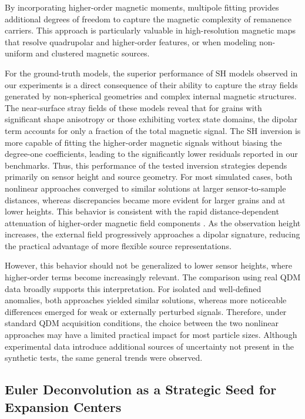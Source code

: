 By incorporating higher-order magnetic moments, multipole fitting provides additional degrees of freedom to capture the magnetic complexity of remanence carriers. This approach is particularly valuable in high-resolution magnetic maps that resolve quadrupolar and higher-order features, or when modeling non-uniform and clustered magnetic sources.

For the ground-truth models, the superior performance of SH models observed in our experiments is a direct consequence of their ability to capture the stray fields generated by non-spherical geometries and complex internal magnetic structures. The near-surface stray fields of these models reveal that for grains with significant shape anisotropy or those exhibiting vortex state domains, the dipolar term accounts for only a fraction of the total magnetic signal. The SH inversion is more capable of fitting the higher-order magnetic signals without biasing the degree-one coefficients, leading to the significantly lower residuals reported in our benchmarks. Thus, this performance of the tested inversion strategies depends primarily on sensor height and source geometry. For most simulated cases, both nonlinear approaches converged to similar solutions at larger sensor-to-sample distances, whereas discrepancies became more evident for larger grains and at lower heights. This behavior is consistent with the rapid distance-dependent attenuation of higher-order magnetic field components \citep{Bellon2026, CortesOrtuno2022}. As the observation height increases, the external field progressively approaches a dipolar signature, reducing the practical advantage of more flexible source representations. 

However, this behavior should not be generalized to lower sensor heights, where higher-order terms become increasingly relevant. The comparison using real QDM data broadly supports this interpretation. For isolated and well-defined anomalies, both approaches yielded similar solutions, whereas more noticeable differences emerged for weak or externally perturbed signals. Therefore, under standard QDM acquisition conditions, the choice between the two nonlinear approaches may have a limited practical impact for most particle sizes. Although experimental data introduce additional sources of uncertainty not present in the synthetic tests, the same general trends were observed.

\subsection{Euler Deconvolution as a Strategic Seed for Expansion Centers}


